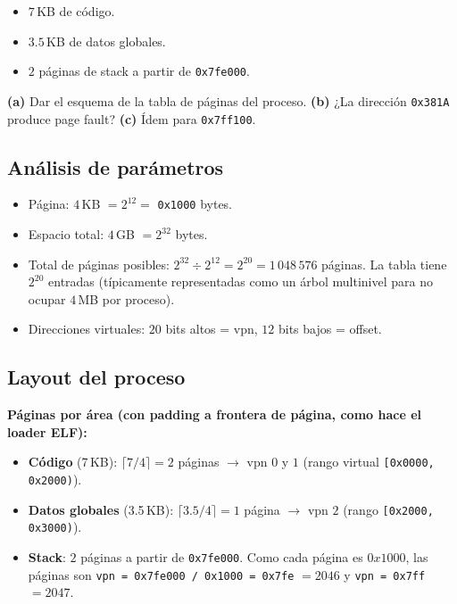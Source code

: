 \documentclass[11pt,a4paper]{article}
\begin{document}
\begin{itemize}[leftmargin=*,nosep]
    \item $7$\,KB de código.
    \item $3.5$\,KB de datos globales.
    \item $2$ páginas de stack a partir de \texttt{0x7fe000}.
\end{itemize}

\textbf{(a)} Dar el esquema de la tabla de páginas del proceso.
\textbf{(b)} ¿La dirección \texttt{0x381A} produce page fault?
\textbf{(c)} Ídem para \texttt{0x7ff100}.

\subsection*{Análisis de parámetros}

\begin{itemize}[leftmargin=*,nosep]
    \item Página: $4$\,KB $= 2^{12} = $ \texttt{0x1000} bytes.
    \item Espacio total: $4$\,GB $= 2^{32}$ bytes.
    \item Total de páginas posibles: $2^{32} \div 2^{12} = 2^{20} =
        1\,048\,576$ páginas. La tabla tiene $2^{20}$ entradas
        (típicamente representadas como un árbol multinivel para no
        ocupar $4$\,MB por proceso).
    \item Direcciones virtuales: $20$ bits altos = vpn, $12$ bits
        bajos = offset.
\end{itemize}

\subsection*{Layout del proceso}

\textbf{Páginas por área (con padding a frontera de página, como hace
el loader ELF):}

\begin{itemize}[leftmargin=*,nosep]
    \item \textbf{Código} (7\,KB): $\lceil 7 / 4 \rceil = 2$ páginas
        $\to$ vpn $0$ y $1$ (rango virtual
        \texttt{[0x0000, 0x2000)}).
    \item \textbf{Datos globales} (3.5\,KB): $\lceil 3.5 / 4 \rceil
        = 1$ página $\to$ vpn $2$ (rango \texttt{[0x2000, 0x3000)}).
    \item \textbf{Stack}: $2$ páginas a partir de
        \texttt{0x7fe000}. Como cada página es $0x1000$, las
        páginas son
        \texttt{vpn = 0x7fe000 / 0x1000 = 0x7fe} $= 2046$ y
        \texttt{vpn = 0x7ff} $= 2047$.
\end{itemize}
\end{document}
